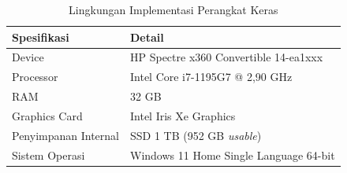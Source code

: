 \begin{table}[h]
\centering
\caption{Lingkungan Implementasi Perangkat Keras}
\label{tab:hwt}
\begin{tabular}{|p{5cm}|p{8cm}|}
\hline
\textbf{Spesifikasi} & \textbf{Detail} \\ \hline
Device               & HP Spectre x360 Convertible 14-ea1xxx \\ \hline
Processor            & Intel Core i7-1195G7 @ 2,90 GHz \\ \hline
RAM                  & 32 GB \\ \hline
Graphics Card        & Intel Iris Xe Graphics \\ \hline
Penyimpanan Internal & SSD 1 TB (952 GB \textit{usable}) \\ \hline
Sistem Operasi       & Windows 11 Home Single Language 64-bit \\ \hline
\end{tabular}
\end{table}